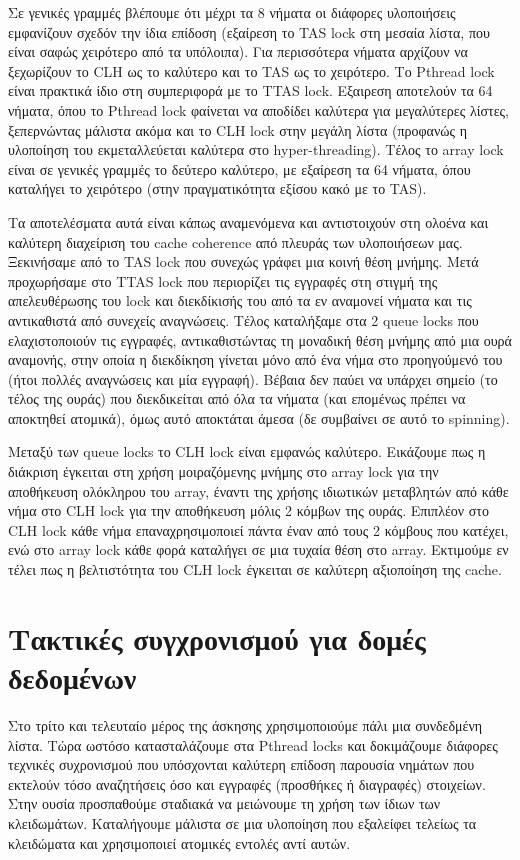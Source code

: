\documentclass[12pt,titlepage]{article}
\begin{document}
Σε γενικές γραμμές βλέπουμε ότι μέχρι τα 8 νήματα οι διάφορες υλοποιήσεις
εμφανίζουν σχεδόν την ίδια επίδοση (εξαίρεση το TAS lock στη μεσαία λίστα, που
είναι σαφώς χειρότερο από τα υπόλοιπα). Για περισσότερα νήματα αρχίζουν να
ξεχωρίζουν το CLH ως το καλύτερο και το TAS ως το χειρότερο. Το Pthread lock
είναι πρακτικά ίδιο στη συμπεριφορά με το TTAS lock. Εξαιρεση αποτελούν τα 64
νήματα, όπου το Pthread lock φαίνεται να αποδίδει καλύτερα για μεγαλύτερες
λίστες, ξεπερνώντας μάλιστα ακόμα και το CLH lock στην μεγάλη λίστα (προφανώς η
υλοποίηση του εκμεταλλεύεται καλύτερα στο hyper-threading). Τέλος το array lock
είναι σε γενικές γραμμές το δεύτερο καλύτερο, με εξαίρεση τα 64 νήματα, όπου
καταλήγει το χειρότερο (στην πραγματικότητα εξίσου κακό με το TAS).

Τα αποτελέσματα αυτά είναι κάπως αναμενόμενα και αντιστοιχούν στη ολοένα και
καλύτερη διαχείριση του cache coherence από πλευράς των υλοποιήσεων μας.
Ξεκινήσαμε από το TAS lock που συνεχώς γράφει μια κοινή θέση μνήμης. Μετά
προχωρήσαμε στο TTAS lock που περιορίζει τις εγγραφές στη στιγμή της
απελευθέρωσης του lock και διεκδίκισής του από τα εν αναμονεί νήματα και τις
αντικαθιστά από συνεχείς αναγνώσεις. Τέλος καταλήξαμε στα 2 queue locks που
ελαχιστοποιούν τις εγγραφές, αντικαθιστώντας τη μοναδική θέση μνήμης από μια
ουρά αναμονής, στην οποία η διεκδίκηση γίνεται μόνο από ένα νήμα στο προηγούμενό
του (ήτοι πολλές αναγνώσεις και μία εγγραφή). Βέβαια δεν παύει να υπάρχει σημείο
(το τέλος της ουράς) που διεκδικείται από όλα τα νήματα (και επομένως πρέπει να
αποκτηθεί ατομικά), όμως αυτό αποκτάται άμεσα (δε συμβαίνει σε αυτό το
spinning).

Μεταξύ των queue locks το CLH lock είναι εμφανώς καλύτερο. Εικάζουμε πως η
διάκριση έγκειται στη χρήση μοιραζόμενης μνήμης στο array lock για την
αποθήκευση ολόκληρου του array, έναντι της χρήσης ιδιωτικών μεταβλητών από κάθε
νήμα στο CLH lock για την αποθήκευση μόλις 2 κόμβων της ουράς. Επιπλέον στο CLH
lock κάθε νήμα επαναχρησιμοποιεί πάντα έναν από τους 2 κόμβους που κατέχει, ενώ
στο array lock κάθε φορά καταλήγει σε μια τυχαία θέση στο array. Εκτιμούμε εν
τέλει πως η βελτιστότητα του CLH lock έγκειται σε καλύτερη αξιοποίηση της cache.

\newpage

\section{Τακτικές συγχρονισμού για δομές δεδομένων}

Στο τρίτο και τελευταίο μέρος της άσκησης χρησιμοποιούμε πάλι μια συνδεδμένη
λίστα. Τώρα ωστόσο κατασταλάζουμε στα Pthread locks και δοκιμάζουμε διάφορες
τεχνικές συχρονισμού που υπόσχονται καλύτερη επίδοση παρουσία νημάτων που
εκτελούν τόσο αναζητήσεις όσο και εγγραφές (προσθήκες ή διαγραφές) στοιχείων.
Στην ουσία προσπαθούμε σταδιακά να μειώνουμε τη χρήση των ίδιων των κλειδωμάτων.
Καταλήγουμε μάλιστα σε μια υλοποίηση που εξαλείφει τελείως τα κλειδώματα και
χρησιμοποιεί ατομικές εντολές αντί αυτών.
\end{document}
